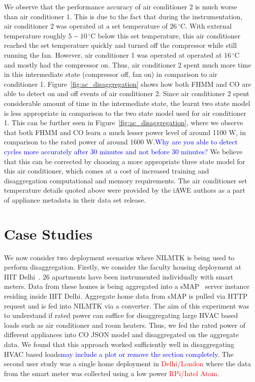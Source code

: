 \documentclass{sig-alternate}
\newcommand{\redcolor}[1]{\textcolor{red}{#1}}
\newcommand{\bluecolor}[1]{\textcolor{blue}{#1}}
\newcommand{\figref}[1]{Figure~\ref{#1}}
\begin{document}
We observe that the performance accuracy of air conditioner 2 is much worse than air conditioner 1. This is due to the fact that during the instrumentation, air conditioner 2 was operated at a set temperature of $26\,^{\circ}\mathrm{C}$. With external temperature roughly $5-10\,^{\circ}\mathrm{C}$ below this set temperature, this air conditioner reached the set temperature quickly and turned off the compressor while still running the fan. However, air conditioner 1 was operated at operated at $16\,^{\circ}\mathrm{C}$ and mostly had the compressor on. Thus, air conditioner 2 spent much more time in this intermediate state (compressor off, fan on) in comparison to air conditioner 1. \figref{fig:ac_disaggregation} shows how both FHMM and CO are able to detect on and off events of air conditioner 2. Since air conditioner 2 spent considerable amount of time in the intermediate state, the learnt two state model is less appropriate in comparison to the two state model used for air conditioner 1. This can be further seen in \figref{fig:ac_disaggregation}, where we observe that both FHMM and CO learn a much lesser power level of around 1100 W, in comparison to the rated power of around 1600 W.\bluecolor{Why are you able to detect cycles more accurately after 30 minutes and not before 30 minutes?} We believe that this can be corrected by choosing a more appropriate three state model for this air conditioner, which comes at a cost of increased training and disaggregation computational and memory requirements. The air conditioner set temperature details quoted above were provided by the iAWE authors as a part of appliance metadata in their data set release.




\section{Case Studies}
\label{sec:use_case}

\noindent
We now consider two deployment scenarios where NILMTK is being used to perform disaggregation. Firstly, we consider the faculty housing deployment at IIIT Delhi~\cite{batra_2012}. 26 apartments have been instrumented individually with smart meters. Data from these homes is being aggregated into a sMAP~\cite{smap} server instance residing inside IIIT Delhi. Aggregate home data from sMAP is pulled via HTTP request and is fed into NILMTK via a converter. The aim of this experiment was to understand if rated power can suffice for disaggregating large HVAC based loads such as air conditioner and room heaters. Thus, we fed the rated power of different appliances into CO JSON model and disaggregated on the aggregate data. We found that this approach worked sufficiently well in disaggregating HVAC based loads\bluecolor{may include a plot or remove the section completely}. The second user study was a single home deployment in \redcolor{Delhi/London} where the data from the smart meter was collected using a low power \redcolor{RPi/Intel Atom}.
\end{document}
